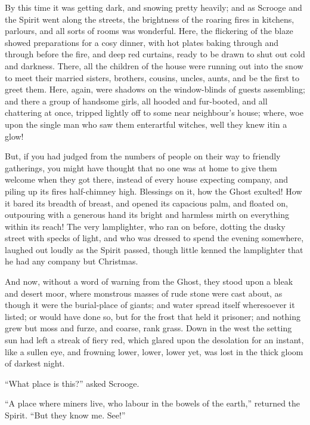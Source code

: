 \documentclass[paper=5.5in:8.5in,BCOR=5mm,twoside,DIV=calc,12pt,usegeometry]{scrbook} %
\begin{document}
By this time it was getting dark, and snowing pretty heavily; and as Scrooge and the Spirit went along the streets, the brightness of the roaring fires in kitchens, parlours, and all sorts of rooms was wonderful. Here, the flickering of the blaze showed preparations for a cosy dinner, with hot plates baking through and through before the fire, and deep red curtains, ready to be drawn to shut out cold and darkness. There, all the children of the house were running out into the snow to meet their married sisters, brothers, cousins, uncles, aunts, and be the first to greet them. Here, again, were shadows on the window-blinds of guests assembling; and there a group of handsome girls, all hooded and fur-booted, and all chattering at once, tripped lightly off to some near neighbour's house; where, woe upon the single man who saw them enter\textemdash artful witches, well they knew it\textemdash in a glow!

But, if you had judged from the numbers of people on their way to friendly gatherings, you might have thought that no one was at home to give them welcome when they got there, instead of every house expecting company, and piling up its fires half-chimney high. Blessings on it, how the Ghost exulted! How it bared its breadth of breast, and opened its capacious palm, and floated on, outpouring with a generous hand its bright and harmless mirth on everything within its reach! The very lamplighter, who ran on before, dotting the dusky street with specks of light, and who was dressed to spend the evening somewhere, laughed out loudly as the Spirit passed, though little kenned the lamplighter that he had any company but Christmas.

And now, without a word of warning from the Ghost, they stood upon a bleak and desert moor, where monstrous masses of rude stone were cast about, as though it were the burial-place of giants; and water spread itself wheresoever it listed; or would have done so, but for the frost that held it prisoner; and nothing grew but moss and furze, and coarse, rank grass. Down in the west the setting sun had left a streak of fiery red, which glared upon the desolation for an instant, like a sullen eye, and frowning lower, lower, lower yet, was lost in the thick gloom of darkest night.

\enquote{What place is this?} asked Scrooge.

\enquote{A place where miners live, who labour in the bowels of the earth,} returned the Spirit. \enquote{But they know me. See!}
\end{document}
